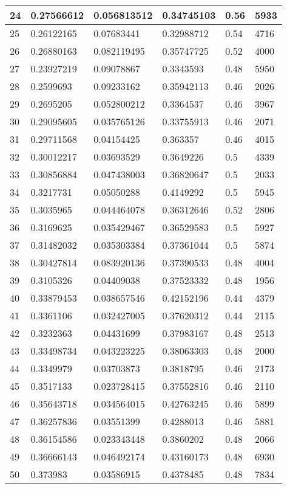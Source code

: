 \begin{longtable}{|l|l|l|l|l|l|}
24 & 0.27566612 & 0.056813512 & 0.34745103 & 0.56 & 5933 \\ \hline 
25 & 0.26122165 & 0.07683441 & 0.32988712 & 0.54 & 4716 \\ \hline 
26 & 0.26880163 & 0.082119495 & 0.35747725 & 0.52 & 4000 \\ \hline 
27 & 0.23927219 & 0.09078867 & 0.3343593 & 0.48 & 5950 \\ \hline 
28 & 0.2599693 & 0.09233162 & 0.35942113 & 0.46 & 2026 \\ \hline 
29 & 0.2695205 & 0.052800212 & 0.3364537 & 0.46 & 3967 \\ \hline 
30 & 0.29095605 & 0.035765126 & 0.33755913 & 0.46 & 2071 \\ \hline 
31 & 0.29711568 & 0.04154425 & 0.363357 & 0.46 & 4015 \\ \hline 
32 & 0.30012217 & 0.03693529 & 0.3649226 & 0.5 & 4339 \\ \hline 
33 & 0.30856884 & 0.047438003 & 0.36820647 & 0.5 & 2033 \\ \hline 
34 & 0.3217731 & 0.05050288 & 0.4149292 & 0.5 & 5945 \\ \hline 
35 & 0.3035965 & 0.044464078 & 0.36312646 & 0.52 & 2806 \\ \hline 
36 & 0.3169625 & 0.035429467 & 0.36529583 & 0.5 & 5927 \\ \hline 
37 & 0.31482032 & 0.035303384 & 0.37361044 & 0.5 & 5874 \\ \hline 
38 & 0.30427814 & 0.083920136 & 0.37390533 & 0.48 & 4004 \\ \hline 
39 & 0.3105326 & 0.04409038 & 0.37523332 & 0.48 & 1956 \\ \hline 
40 & 0.33879453 & 0.038657546 & 0.42152196 & 0.44 & 4379 \\ \hline 
41 & 0.3361106 & 0.032427005 & 0.37620312 & 0.44 & 2115 \\ \hline 
42 & 0.3232363 & 0.04431699 & 0.37983167 & 0.48 & 2513 \\ \hline 
43 & 0.33498734 & 0.043223225 & 0.38063303 & 0.48 & 2000 \\ \hline 
44 & 0.3349979 & 0.03703873 & 0.3818795 & 0.46 & 2173 \\ \hline 
45 & 0.3517133 & 0.023728415 & 0.37552816 & 0.46 & 2110 \\ \hline 
46 & 0.35643718 & 0.034564015 & 0.42763245 & 0.46 & 5899 \\ \hline 
47 & 0.36257836 & 0.03551399 & 0.4288013 & 0.46 & 5881 \\ \hline 
48 & 0.36154586 & 0.023343448 & 0.3860202 & 0.48 & 2066 \\ \hline 
49 & 0.36666143 & 0.046492174 & 0.43160173 & 0.48 & 6930 \\ \hline 
50 & 0.373983 & 0.03586915 & 0.4378485 & 0.48 & 7834 \\ \hline 
\end{longtable}